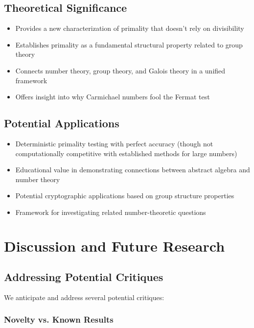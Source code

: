 \documentclass[11pt,a4paper]{article}
\begin{document}
\subsection{Theoretical Significance}

\begin{itemize}
    \item Provides a new characterization of primality that doesn't rely on divisibility
    \item Establishes primality as a fundamental structural property related to group theory
    \item Connects number theory, group theory, and Galois theory in a unified framework
    \item Offers insight into why Carmichael numbers fool the Fermat test
\end{itemize}

\subsection{Potential Applications}

\begin{itemize}
    \item Deterministic primality testing with perfect accuracy (though not computationally competitive with established methods for large numbers)
    \item Educational value in demonstrating connections between abstract algebra and number theory
    \item Potential cryptographic applications based on group structure properties
    \item Framework for investigating related number-theoretic questions
\end{itemize}

\section{Discussion and Future Research}

\subsection{Addressing Potential Critiques}

We anticipate and address several potential critiques:

\subsubsection{Novelty vs. Known Results}
\end{document}
